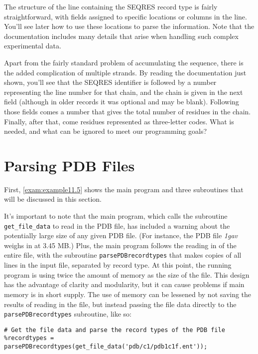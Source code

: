 The structure of the line containing the SEQRES record type is fairly straightforward, with fields assigned to specific locations or columns in the line. You'll see later how to use these locations to parse the information. Note that the documentation includes many details that arise when handling such complex experimental data.

Apart from the fairly standard problem of accumulating the sequence, there is the added complication of multiple strands. By reading the documentation just shown, you'll see that the SEQRES identifier is followed by a number representing the line number for that chain, and the chain is given in the next field (although in older records it was optional and may be blank). Following those fields comes a number that gives the total number of residues in the chain. Finally, after that, come residues represented as three-letter codes. What is needed, and what can be ignored to meet our programming goals? 

\section{Parsing PDB Files}
First, \autoref{exam:example11.5} shows the main program and three subroutines that will be discussed in this section. 



It's important to note that the main program, which calls the subroutine \verb|get_file_data| to read in the PDB file, has included a warning about the potentially large size of any given PDB file. (For instance, the PDB file \textit{1gav} weighs in at 3.45 MB.) Plus, the main program follows the reading in of the entire file, with the subroutine \verb|parsePDBrecordtypes| that makes copies of all lines in the input file, separated by record type. At this point, the running program is using twice the amount of memory as the size of the file. This design has the advantage of clarity and modularity, but it can cause problems if main memory is in short supply. The use of memory can be lessened by not saving the results of reading in the file, but instead passing the file data directly to the \verb|parsePDBrecordtypes| subroutine, like so: 

\begin{lstlisting}
# Get the file data and parse the record types of the PDB file
%recordtypes = parsePDBrecordtypes(get_file_data('pdb/c1/pdb1c1f.ent'));
\end{lstlisting}

